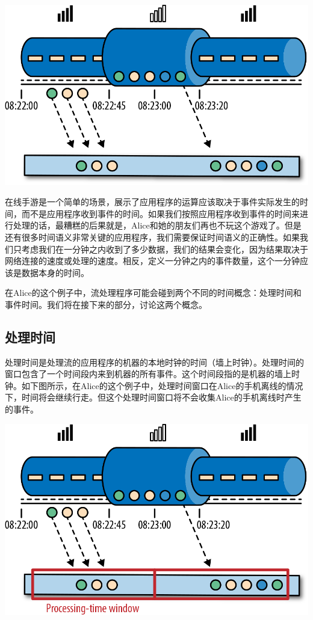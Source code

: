 \documentclass[cn,11pt,chinese]{elegantbook}
\begin{document}
\includegraphics{images/spaf_0211.png}

在线手游是一个简单的场景，展示了应用程序的运算应该取决于事件实际发生的时间，而不是应用程序收到事件的时间。如果我们按照应用程序收到事件的时间来进行处理的话，最糟糕的后果就是，Alice和她的朋友们再也不玩这个游戏了。但是还有很多时间语义非常关键的应用程序，我们需要保证时间语义的正确性。如果我们只考虑我们在一分钟之内收到了多少数据，我们的结果会变化，因为结果取决于网络连接的速度或处理的速度。相反，定义一分钟之内的事件数量，这个一分钟应该是数据本身的时间。

在Alice的这个例子中，流处理程序可能会碰到两个不同的时间概念：处理时间和事件时间。我们将在接下来的部分，讨论这两个概念。

\hypertarget{ux5904ux7406ux65f6ux95f4}{%
\subsection{处理时间}\label{ux5904ux7406ux65f6ux95f4}}

处理时间是处理流的应用程序的机器的本地时钟的时间（墙上时钟）。处理时间的窗口包含了一个时间段内来到机器的所有事件。这个时间段指的是机器的墙上时钟。如下图所示，在Alice的这个例子中，处理时间窗口在Alice的手机离线的情况下，时间将会继续行走。但这个处理时间窗口将不会收集Alice的手机离线时产生的事件。

\includegraphics{images/spaf_0212.png}
\end{document}
